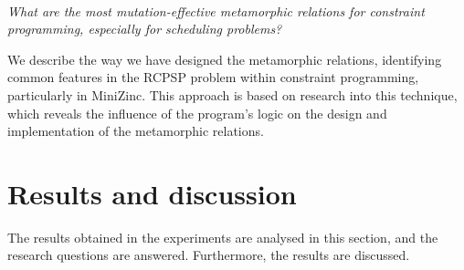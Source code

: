 \paragraph{\rqidentifying}
\emph{What are the most mutation-effective metamorphic
  relations for constraint programming, especially for scheduling
  problems?}


We describe the way we have designed the metamorphic relations,
identifying common features in the RCPSP problem within constraint
programming, particularly in MiniZinc. This approach is based on
research into this technique, which reveals the influence of the
program's logic on the design and implementation of the metamorphic
relations.




\iffalse

Explicar cómo se van a responder esas research questions: programas MiniZinc seleccionados, conjuntos de pruebas iniciales seleccionados, cuántos mutantes salen de esos programas y cuántos son equivalentes (explicando cómo se detectaron los equivalentes), qué se va a medir (mutantes muertos por el conjunto inicial y por las pruebas producidas por las reglas metamórficas).

\fi



\section{Results and discussion}
\label{sec:result}

The results obtained in the experiments are analysed in this section, and the research questions are answered. Furthermore, the results are discussed.

